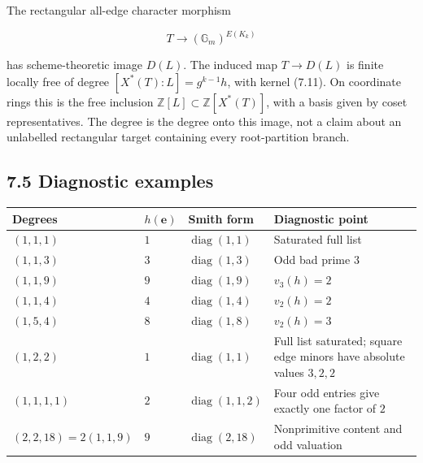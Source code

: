 \documentclass[
  11pt,
  a4paper,
]{article}
\newcounter{none} %
\begin{document}
The rectangular all-edge character morphism

\[
 T\longrightarrow(\mathbb G_m)^{E(K_k)}
\]

has scheme-theoretic image \(D(L)\). The induced map \(T\to D(L)\) is
finite locally free of degree \([X^*(T):L]=g^{k-1}h\), with kernel
(7.11). On coordinate rings this is the free inclusion
\(\mathbb Z[L]\subset\mathbb Z[X^*(T)]\), with a basis given by coset
representatives. The degree is the degree onto this image, not a claim
about an unlabelled rectangular target containing every root-partition
branch.

\subsection{7.5 Diagnostic examples}\label{diagnostic-examples}

{\def\LTcaptype{none} %
\begin{longtable}[]{@{}
  >{\raggedright\arraybackslash}p{}
  >{\raggedleft\arraybackslash}p{}
  >{\raggedright\arraybackslash}p{}
  >{\raggedright\arraybackslash}p{}@{}}
\toprule\noalign{}
\begin{minipage}[b]{\linewidth}\raggedright
Degrees
\end{minipage} & \begin{minipage}[b]{\linewidth}\raggedleft
\(h(\mathbf e)\)
\end{minipage} & \begin{minipage}[b]{\linewidth}\raggedright
Smith form
\end{minipage} & \begin{minipage}[b]{\linewidth}\raggedright
Diagnostic point
\end{minipage} \\
\midrule\noalign{}
\endhead
\bottomrule\noalign{}
\endlastfoot
\((1,1,1)\) & \(1\) & \(\operatorname{diag}(1,1)\) & Saturated full
list \\
\((1,1,3)\) & \(3\) & \(\operatorname{diag}(1,3)\) & Odd bad prime
\(3\) \\
\((1,1,9)\) & \(9\) & \(\operatorname{diag}(1,9)\) & \(v_3(h)=2\) \\
\((1,1,4)\) & \(4\) & \(\operatorname{diag}(1,4)\) & \(v_2(h)=2\) \\
\((1,5,4)\) & \(8\) & \(\operatorname{diag}(1,8)\) & \(v_2(h)=3\) \\
\((1,2,2)\) & \(1\) & \(\operatorname{diag}(1,1)\) & Full list
saturated; square edge minors have absolute values \(3,2,2\) \\
\((1,1,1,1)\) & \(2\) & \(\operatorname{diag}(1,1,2)\) & Four odd
entries give exactly one factor of \(2\) \\
\((2,2,18)=2(1,1,9)\) & \(9\) & \(\operatorname{diag}(2,18)\) &
Nonprimitive content and odd valuation \\
\end{longtable}
}
\end{document}
